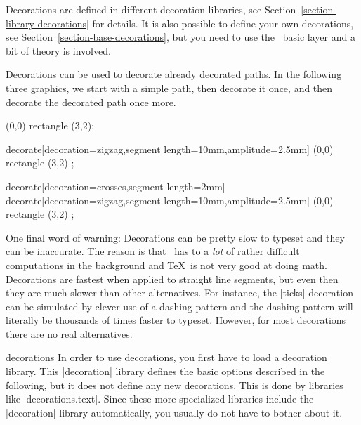 Decorations are defined in different decoration libraries, see
Section~\ref{section-library-decorations} for details. It is also possible to
define your own decorations, see Section~\ref{section-base-decorations}, but
you need to use the \pgfname\ basic layer and a bit of theory is involved.

Decorations can be used to decorate already decorated paths. In the following
three graphics, we start with a simple path, then decorate it once, and then
decorate the decorated path once more.
%
\begin{codeexample}[]
\tikz \fill [fill=blue!20,draw=blue,thick]
  (0,0) rectangle (3,2);
\end{codeexample}
%
\begin{codeexample}[preamble={\usetikzlibrary{decorations.pathmorphing}}]
\tikz \fill [fill=blue!20,draw=blue,thick]
  decorate[decoration={zigzag,segment length=10mm,amplitude=2.5mm}]
    { (0,0) rectangle (3,2) };
\end{codeexample}
%
\begin{codeexample}[preamble={\usetikzlibrary{
    decorations.pathmorphing,
    decorations.shapes,
}}]
\tikz \fill [fill=blue!20,draw=blue,thick]
  decorate[decoration={crosses,segment length=2mm}] {
    decorate[decoration={zigzag,segment length=10mm,amplitude=2.5mm}] {
      (0,0) rectangle (3,2)
    }
  };
\end{codeexample}

One final word of warning: Decorations can be pretty slow to typeset and they
can be inaccurate. The reason is that \pgfname\ has to a \emph{lot} of rather
difficult computations in the background and \TeX\ is not very good at doing
math. Decorations are fastest when applied to straight line segments, but even
then they are much slower than other alternatives. For instance, the |ticks|
decoration can be simulated by clever use of a dashing pattern and the dashing
pattern will literally be thousands of times faster to typeset. However, for
most decorations there are no real alternatives.

\begin{tikzlibrary}{decorations}
    In order to use decorations, you first have to load a decoration library.
    This |decoration| library defines the basic options described in the
    following, but it does not define any new decorations. This is done by
    libraries like |decorations.text|. Since these more specialized libraries
    include the |decoration| library automatically, you usually do not have to
    bother about it.
\end{tikzlibrary}


